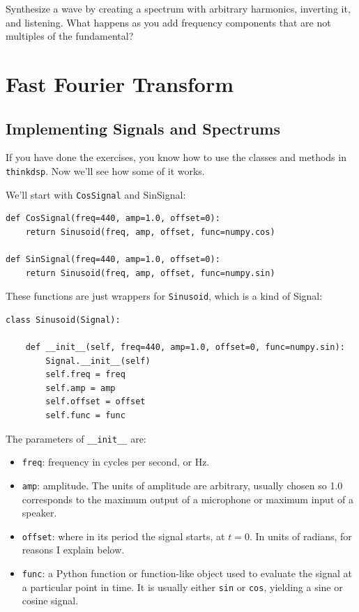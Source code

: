 \documentclass[12pt]{book}
\begin{document}
\begin{exercise}
Synthesize a wave by creating a spectrum with arbitrary harmonics,
inverting it, and listening.  What happens as you add frequency
components that are not multiples of the fundamental?
\end{exercise}




\chapter{Fast Fourier Transform}
\label{implementation}

\section{Implementing Signals and Spectrums}

If you have done the exercises, you know how to use the
classes and methods in {\tt thinkdsp}.  Now we'll see how
some of it works.

We'll start with {\tt CosSignal} and {SinSignal}:

\begin{verbatim}
def CosSignal(freq=440, amp=1.0, offset=0):
    return Sinusoid(freq, amp, offset, func=numpy.cos)

def SinSignal(freq=440, amp=1.0, offset=0):
    return Sinusoid(freq, amp, offset, func=numpy.sin)
\end{verbatim}

These functions are just wrappers for {\tt Sinusoid}, which
is a kind of Signal:

\begin{verbatim}
class Sinusoid(Signal):
    
    def __init__(self, freq=440, amp=1.0, offset=0, func=numpy.sin):
        Signal.__init__(self)
        self.freq = freq
        self.amp = amp
        self.offset = offset
        self.func = func
\end{verbatim}

The parameters of \verb"__init__" are:

\begin{itemize}

\item {\tt freq}: frequency in cycles per second, or Hz.

\item {\tt amp}: amplitude.  The units of amplitude are arbitrary,
usually chosen so 1.0 corresponds to the maximum output of a
microphone or maximum input of a speaker.

\item {\tt offset}: where in its period the signal starts, at $t=0$.
In units of radians, for reasons I explain below.

\item {\tt func}: a Python function or function-like object used
to evaluate the signal at a particular point in time.  It is
usually either {\tt sin} or {\tt cos}, yielding a sine or
cosine signal.

\end{itemize}
\end{document}
